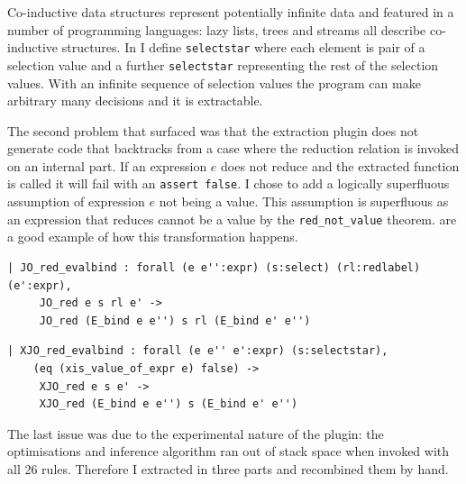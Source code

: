 \documentclass[12pt,twoside,notitlepage]{report}
\begin{document}
Co-inductive data structures represent potentially infinite data and featured in a number of programming languages: lazy lists, trees and streams all describe co-inductive structures. In  I define \verb|selectstar| where each element is pair of a selection value and a further \verb|selectstar| representing the rest of the selection values.  With an infinite sequence of selection values the program can make arbitrary many decisions and it is extractable.

The second problem that surfaced was that the extraction plugin does not generate code that backtracks from a case where the reduction relation is invoked on an internal part. If an expression $ e $ does not reduce and the extracted function is called it will fail with an \lstinline|assert false|. I chose to add a logically superfluous assumption of expression $ e $ not being a value. This assumption is superfluous as an expression that reduces cannot be a value by the \verb|red_not_value| theorem.   are a good example of how this transformation happens. \vspace{4mm}

\begin{minipage}{0.9\linewidth}

\begin{lstlisting}[language={Coq},caption={Coq reduction clause with unsafe assumption}, label={lst:coqredunsafe}]
| JO_red_evalbind : forall (e e'':expr) (s:select) (rl:redlabel) (e':expr),
     JO_red e s rl e' ->
     JO_red (E_bind e e'') s rl (E_bind e' e'')
\end{lstlisting}

\end{minipage}

\begin{minipage}{\linewidth}

\begin{lstlisting}[language={Coq},caption={Coq extractable reduction clause with safe assumption}, label={lst:coqxredsafe}]
 | XJO_red_evalbind : forall (e e'' e':expr) (s:selectstar),
    (eq (xis_value_of_expr e) false) ->
     XJO_red e s e' ->
     XJO_red (E_bind e e'') s (E_bind e' e'')
\end{lstlisting}

\end{minipage}


The last issue was due to the experimental nature of the plugin: the optimisations and inference algorithm ran out of stack space when invoked with all 26 rules. Therefore I extracted in three parts and recombined them by hand.
\end{document}
